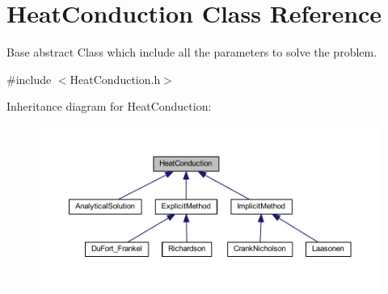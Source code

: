 \hypertarget{class_heat_conduction}{}\section{Heat\+Conduction Class Reference}
\label{class_heat_conduction}


Base abstract Class which include all the parameters to solve the problem.  




{\ttfamily \#include $<$Heat\+Conduction.\+h$>$}



Inheritance diagram for Heat\+Conduction\+:\nopagebreak
\begin{figure}[H]
\begin{center}
\leavevmode
\includegraphics[width=350pt]{class_heat_conduction__inherit__graph}
\end{center}
\end{figure}
